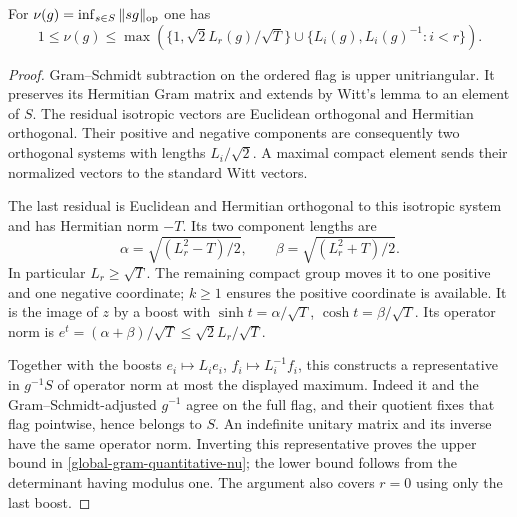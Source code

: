 \begin{lemma}
\label{global-gram-quantitative-quotient-geometry}
For $\nu(g)=\inf_{s\in S}\|sg\|_{\rm op}$ one has
\begin{equation}\label{global-gram-quantitative-nu}
 1\le\nu(g)\le
 \max\left(\{1,\sqrt2L_r(g)/\sqrt T\}\cup
                  \{L_i(g),L_i(g)^{-1}:i<r\}\right).
\end{equation}
\end{lemma}
\begin{proof}
Gram--Schmidt subtraction on the ordered flag is upper
unitriangular.  It preserves its Hermitian Gram matrix and
extends by Witt's lemma to an element of $S$.
The residual isotropic vectors are Euclidean orthogonal and
Hermitian orthogonal.  Their positive and negative components
are consequently two orthogonal systems with lengths
$L_i/\sqrt2$.  A maximal compact element sends their normalized
vectors to the standard Witt vectors.

The last residual is Euclidean and Hermitian orthogonal to this
isotropic system and has Hermitian norm $-T$.  Its two component
lengths are
\[
 \alpha=\sqrt{(L_r^2-T)/2},\qquad
 \beta=\sqrt{(L_r^2+T)/2}.
\]
In particular $L_r\ge\sqrt T$.  The remaining compact group
moves it to one positive and one negative coordinate; $k\ge1$
ensures the positive coordinate is available.  It is the image
of $z$ by a boost with
$\sinh t=\alpha/\sqrt T$, $\cosh t=\beta/\sqrt T$.
Its operator norm is
$e^t=(\alpha+\beta)/\sqrt T\le\sqrt2L_r/\sqrt T$.

Together with the boosts
$e_i\mapsto L_i e_i$, $f_i\mapsto L_i^{-1}f_i$, this constructs
a representative in $g^{-1}S$ of operator norm at most the
displayed maximum.  Indeed it and the Gram--Schmidt-adjusted
$g^{-1}$ agree on the full flag, and their quotient fixes that
flag pointwise, hence belongs to $S$.
An indefinite unitary matrix and its inverse have the same
operator norm.  Inverting this representative proves the upper
bound in \eqref{global-gram-quantitative-nu}; the lower bound
follows from the determinant having modulus one.
The argument also covers $r=0$ using only the last boost.
\end{proof}

